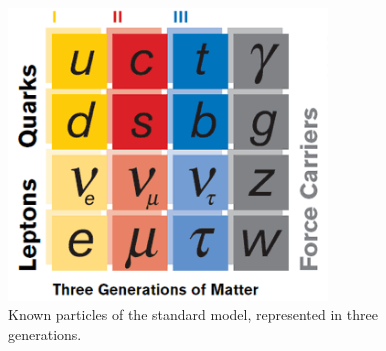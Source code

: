 
 \begin{figure}[htb]
  \begin{center}
    \includegraphics[width=240pt]{Figures/theory-standard-model-symmetry-mag.png}
  \end{center}
  \caption[\fixspacing Particles of the standard model]
	  {\fixspacing Known particles of the standard model, 
	    represented in three generations.
	  }
  \label{fig:StandardModel}
 \end{figure}


